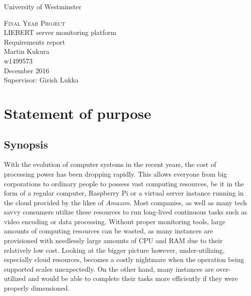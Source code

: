 \documentclass[12pt,a4paper,table]{article}
\begin{document}
    \begin{titlepage}
        \large{University of Westminster}
        \vspace*{\fill}
        \begin{center}
            \Huge{\textsc{Final Year Project}}\\
            \LARGE{LIEBERT server monitoring platform}\\
            \Large{Requirements report}\\[0.7cm]
            \Large{Martin Kukura}\\
            \Large{w1499573}\\[2.0cm]
            \large{December 2016}\\[3cm]
            \large{Supervisor: Girish Lukka}
        \end{center}
        \vspace*{\fill}
    \end{titlepage}
    \pagebreak

    \tableofcontents
    \listoffigures

    \pagebreak


    \section{Statement of purpose}
        \subsection{Synopsis}
            With the evolution of computer systems in the recent years, the cost of processing power has been dropping rapidly. This allows everyone from big corporations to ordinary people to possess vast computing resources, be it in the form of a regular computer, Raspberry Pi or a virtual server instance running in the cloud provided by the likes of \textit{Amazon}. Most companies, as well as many tech savvy consumers utilize these resources to run long-lived continuous tasks such as video encoding or data processing. Without proper monitoring tools, large amounts of computing resources can be wasted, as many instances are provisioned with needlessly large amounts of CPU and RAM due to their relatively low cost. Looking at the bigger picture however, under-utilizing, especially cloud resources, becomes a costly nightmare when the operation being supported scales unexpectedly. On the other hand, many instances are over-utilized and would be able to complete their tasks more efficiently if they were properly dimensioned.
\end{document}
